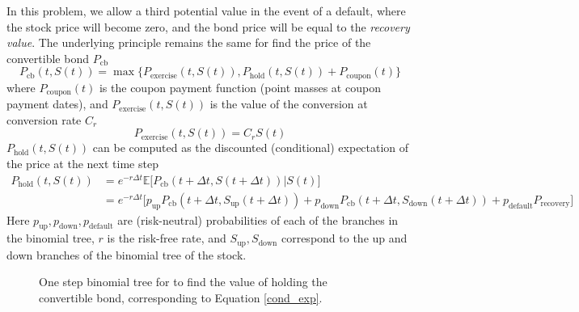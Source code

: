 \documentclass[11pt]{article}
\theoremstyle{definition}
\begin{document}
In this problem, we allow a third potential value 
in the event of a default, where the stock price 
will become zero, and the bond price will be equal to 
the \emph{recovery value}.
The underlying principle remains the same
for find the price of the convertible bond $P_\text{cb}$
%
\begin{equation}
\label{exercise}
  P_\text{cb}(t,S(t)) = \max\Big\{P_\text{exercise}(t,S(t)), 
                        P_\text{hold}(t,S(t)) + 
                        P_\text{coupon}(t)\Big\}
\end{equation}
%
where $P_\text{coupon}(t)$ is the coupon payment function
(point masses at coupon payment dates),
and $P_\text{exercise}(t,S(t))$ is the value of the conversion
at conversion rate $C_r$
%
\begin{equation*}
  P_\text{exercise}(t,S(t)) = C_r S(t)
\end{equation*}
%
$P_\text{hold}(t,S(t))$ can be computed as the 
discounted (conditional) expectation of 
the price at the next time step
%
\begin{equation}
\label{cond_exp}
\begin{aligned}
  P_\text{hold}(t,S(t)) &= e^{-r\Delta t} 
    \mathbb{E}\Big[P_\text{cb}(t+\Delta t,S(t+\Delta t)) \Big| S(t)\Big] \\
  &= e^{-r\Delta t} \Big[p_\text{up} 
    P_\text{cb}(t+\Delta t,S_\text{up}(t+\Delta t)) + 
    p_\text{down} P_\text{cb}(t+\Delta t,S_\text{down}(t+\Delta t)) + 
    p_\text{default} P_\text{recovery} \Big]
\end{aligned}
\end{equation}
%
Here $p_\text{up}, p_\text{down}, p_\text{default}$
are (risk-neutral) probabilities of each of the branches
in the binomial tree, $r$ is the risk-free rate,
and $S_\text{up}, S_\text{down}$ correspond to 
the up and down branches of the binomial tree of the stock.

\begin{figure}[h]
\centering
{}
\caption{One step binomial tree for to find the value of 
  holding the convertible bond,
  corresponding to Equation \eqref{cond_exp}.}
\end{figure}
\end{document}
